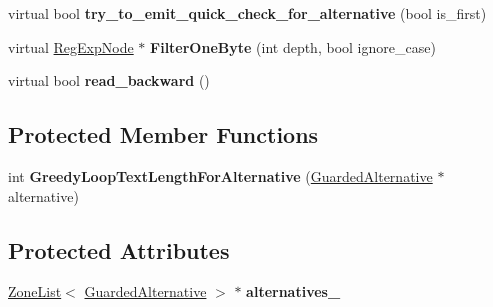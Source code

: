 \begin{DoxyCompactItemize}
\item 
virtual bool {\bfseries try\+\_\+to\+\_\+emit\+\_\+quick\+\_\+check\+\_\+for\+\_\+alternative} (bool is\+\_\+first)\hypertarget{classv8_1_1internal_1_1_choice_node_a92f25918d5b798881b60925507247cdf}{}\label{classv8_1_1internal_1_1_choice_node_a92f25918d5b798881b60925507247cdf}

\item 
virtual \hyperlink{classv8_1_1internal_1_1_reg_exp_node}{Reg\+Exp\+Node} $\ast$ {\bfseries Filter\+One\+Byte} (int depth, bool ignore\+\_\+case)\hypertarget{classv8_1_1internal_1_1_choice_node_adea240331dba8ec30567d32427311252}{}\label{classv8_1_1internal_1_1_choice_node_adea240331dba8ec30567d32427311252}

\item 
virtual bool {\bfseries read\+\_\+backward} ()\hypertarget{classv8_1_1internal_1_1_choice_node_a807bb389712f32f0a2a356708b56d022}{}\label{classv8_1_1internal_1_1_choice_node_a807bb389712f32f0a2a356708b56d022}

\end{DoxyCompactItemize}
\subsection*{Protected Member Functions}
\begin{DoxyCompactItemize}
\item 
int {\bfseries Greedy\+Loop\+Text\+Length\+For\+Alternative} (\hyperlink{classv8_1_1internal_1_1_guarded_alternative}{Guarded\+Alternative} $\ast$alternative)\hypertarget{classv8_1_1internal_1_1_choice_node_a4c728774f51d6874a8894a444486f10e}{}\label{classv8_1_1internal_1_1_choice_node_a4c728774f51d6874a8894a444486f10e}

\end{DoxyCompactItemize}
\subsection*{Protected Attributes}
\begin{DoxyCompactItemize}
\item 
\hyperlink{classv8_1_1internal_1_1_zone_list}{Zone\+List}$<$ \hyperlink{classv8_1_1internal_1_1_guarded_alternative}{Guarded\+Alternative} $>$ $\ast$ {\bfseries alternatives\+\_\+}\hypertarget{classv8_1_1internal_1_1_choice_node_a3820e11ba725590ffc4e1d5d3a2b19ad}{}\label{classv8_1_1internal_1_1_choice_node_a3820e11ba725590ffc4e1d5d3a2b19ad}

\end{DoxyCompactItemize}
